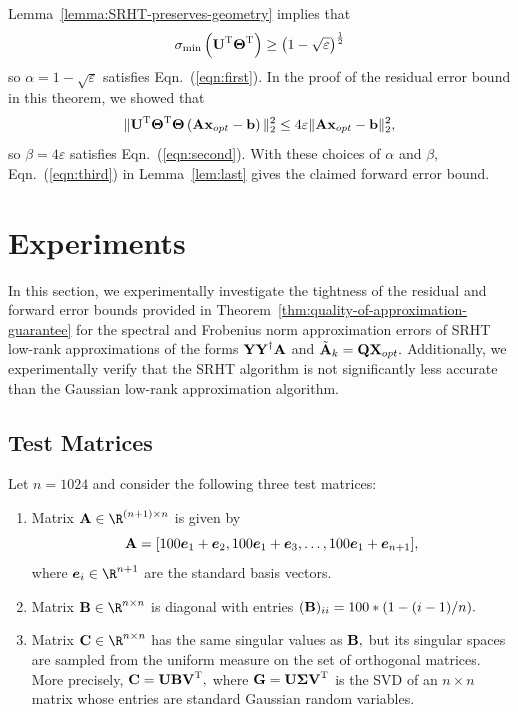 Lemma~\ref{lemma:SRHT-preserves-geometry} implies that
$$\sigma_{\min}\left( {\bm{\mathrm{U}}}^{\textsc{T}} {\bm{\mathrm{\Theta}}}^{\textsc{T}} \right) \ge \left( 1-\sqrt{\varepsilon} \right)^{{1\over 2}}$$
so $\alpha = 1-\sqrt{\varepsilon}$ satisfies Eqn.~(\ref{eqn:first}).
In the proof of the residual error bound in this theorem, we showed that
$$\mbox{}\|{\bm{\mathrm{U}}}^{\textsc{T}} {\bm{\mathrm{\Theta}}}^{\textsc{T}} {\bm{\mathrm{\Theta}}} \left( {\bm{\mathrm{A}}} {\mathbf x}_{opt} - {\mathbf b} \right)\|_2^2 \le 4 \varepsilon \mbox{}\| {\bm{\mathrm{A}}} {\mathbf x}_{opt} - {\mathbf b} \|_2^2,$$
so $\beta = 4 \varepsilon$ satisfies Eqn.~(\ref{eqn:second}). With these choices of $\alpha$ and $\beta,$ Eqn.~(\ref{eqn:third}) in Lemma~\ref{lem:last} gives the claimed forward error bound.

\section{Experiments}\label{sec:experiments}

In this section, we experimentally investigate the tightness of the residual and forward error bounds provided in Theorem~\ref{thm:quality-of-approximation-guarantee} for the spectral and Frobenius norm approximation errors of SRHT low-rank approximations of the forms ${\bm{\mathrm{Y}}}{{\bm{\mathrm{Y}}}}^\dagger{\ensuremath{\bm{\mathrm{A}}}}$ and $\tilde{{\bm{\mathrm{A}}}}_k = {\bm{\mathrm{Q}}} {\bm{\mathrm{X}}}_{opt}.$ Additionally, we experimentally verify that the SRHT algorithm is not significantly less accurate than the Gaussian low-rank approximation algorithm.

\subsection{Test Matrices}
Let $n = 1024$  and consider the following three test matrices:
\begin{enumerate}[1.]
 \item Matrix $\matA \in \R^{(n+1) \times n}$ is given by
\[ {\bm{\mathrm{A}}} = [100 \bm{e}_1 + \bm{e}_2, 100 \bm{e}_1
 + \bm{e}_3, \ldots, 100 \bm{e}_1 + \bm{e}_{n+1}], \]
where $\vec{e}_i \in \R^{n+1}$ are the standard basis vectors.
\item Matrix $\matB \in \R^{n \times n}$ is diagonal with
 entries $({\bm{\mathrm{B}}})_{ii} = 100*(1 - (i-1)/n).$
 \item Matrix $\matC \in \R^{n \times n}$ has the same singular values
   as ${\bm{\mathrm{B}}},$ but its singular spaces are sampled from the uniform
   measure on the set of orthogonal matrices. More precisely, ${\bm{\mathrm{C}}} =
   {\bm{\mathrm{U}}} {\bm{\mathrm{B}}} {\bm{\mathrm{V}}}^{\textsc{T}},$ where ${\bm{\mathrm{G}}} = {\bm{\mathrm{U}}} {\bm{\mathrm{\Sigma}}}
   {\bm{\mathrm{V}}}^{\textsc{T}} $ is the SVD of an $n \times n$ matrix whose entries
   are standard Gaussian random variables.
\end{enumerate}

